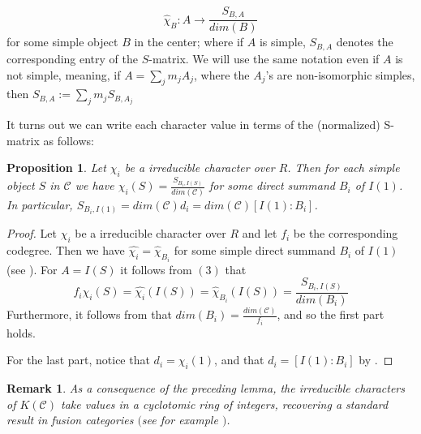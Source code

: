 \documentclass[a4paper,twoside,11pt]{amsart}
\newtheorem*{remark}{Remark}
\newtheorem{proposition}[theorem]{Proposition}
\theoremstyle{plain} %
\theoremstyle{definition}
\begin{document}
    $$
    \widehat{\chi}_B: A\rightarrow \frac{S_{B,A}}{dim(B)}
    $$ 
     for some simple object $B$ in the center; where if $A$ is simple, $S_{B,A}$ denotes the corresponding entry of the $S$-matrix. We will use the same notation even if $A$ is not simple, meaning, if $A=\sum_j m_j A_j$, where the $A_j$'s are non-isomorphic simples, then $S_{B,A}:=\sum_j m_j S_{B,A_j}$
\medskip



It turns out we can write each character value in terms of the (normalized) S-matrix as follows:

\begin{proposition}
	 Let $\chi_i$ be a irreducible character over $R$. Then for each simple object $S$ in $\mathcal{C}$ we have $\chi_i (S)=\frac{S_{B_i,I(S)}}{dim(\mathcal{C})}$ for some direct summand $B_i$ of $I(1)$. In particular, $S_{B_i,I(1)}=dim(\mathcal{C}) d_i=dim(\mathcal{C})[I(1):B_i]$.
\end{proposition}
\begin{proof}
	Let $\chi_i$ be a irreducible character over $R$ and let $f_i$ be the corresponding codegree. Then we have $\widehat{\chi_i}=\widehat{\chi}_{B_i}$ for some simple direct summand $B_i$ of $I(1)$ (see \cite{O2}). For $A=I(S)$ it follows from $(3)$ that
\begin{equation}
	f_i \chi_i (S)=\widehat{\chi_i}(I(S))=\widehat{\chi}_{B_i}(I(S))=\frac{S_{B_i,I(S)}}{dim(B_i)}
\end{equation}
Furthermore, it follows from \cite[Theorem 2.13]{O2} that $dim (B_i)=\frac{dim(\mathcal{C})}{f_i}$, and so the first part holds.

\medskip 
For the last part, notice that $d_i = \chi_i (1)$, and that $d_i= [I(1):B_i]$ by \cite[Theorem 2.13]{O2}.
\end{proof}

\begin{remark}
As a consequence of the preceding lemma, the irreducible
characters of $K(\mathcal{C})$ take values in a cyclotomic ring of
integers, recovering a standard result in fusion categories $($see for example \cite[Corollary 9.3.13]{EGNO}$)$.
\end{remark}
\end{document}
